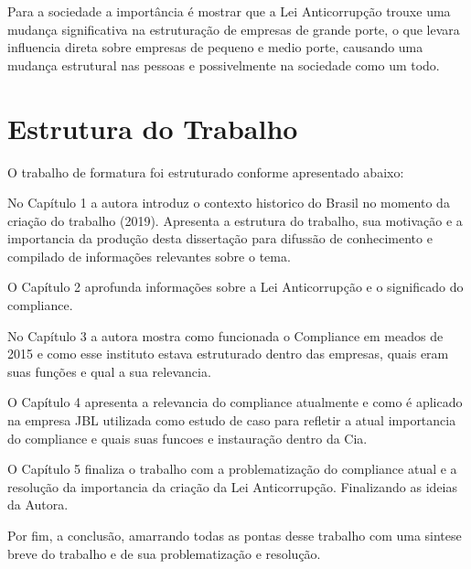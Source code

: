 Para a sociedade a importância é mostrar que a Lei Anticorrupção trouxe uma mudança significativa na estruturação de empresas de grande porte, o que levara influencia direta sobre empresas de pequeno e medio porte, causando uma mudança estrutural nas pessoas e possivelmente na sociedade como um todo. 

\section{Estrutura do Trabalho}
\label{cha:estrutura_do_trabalho}
O trabalho de formatura foi estruturado conforme apresentado abaixo:

No Capítulo 1 a autora introduz o contexto historico do Brasil no momento da criação do trabalho (2019). Apresenta a estrutura do trabalho, sua motivação e a importancia da produção desta dissertação para difussão de conhecimento e compilado de informações relevantes sobre o tema. 

O Capítulo 2 aprofunda informações sobre a Lei Anticorrupção e o significado do compliance.

No Capítulo 3 a autora mostra como funcionada o Compliance em meados de 2015 e como esse instituto estava estruturado dentro das empresas, quais eram suas funções e qual a sua relevancia. 

O Capítulo 4 apresenta a relevancia do compliance atualmente e como é aplicado na empresa JBL utilizada como estudo de caso para refletir a atual importancia do compliance e quais suas funcoes e instauração dentro da Cia. 

O Capítulo 5 finaliza o trabalho com a problematização do compliance atual e a resolução da importancia da criação da Lei Anticorrupção. Finalizando as ideias da Autora. 

Por fim, a conclusão, amarrando todas as pontas desse trabalho com uma sintese breve do trabalho e de sua problematização e resolução. 

